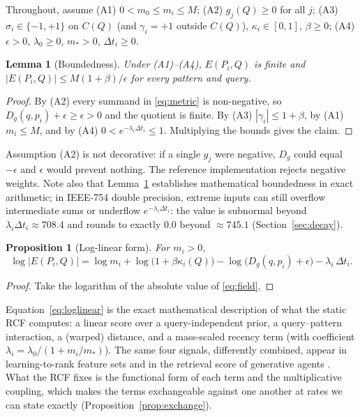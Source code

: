\documentclass[11pt]{article}
\newtheorem{lemma}{Lemma}
\newtheorem{proposition}{Proposition}
\theoremstyle{remark}
\newcommand{\act}{E}
\newcommand{\dist}{D_g}
\begin{document}
Throughout, assume (A1) $0 < m_0 \le m_i\le M$; (A2) $g_j(Q)\ge 0$ for all $j$; (A3) $\sigma_i\in\{-1,+1\}$ on $C(Q)$ (and $\gamma_i=+1$ outside $C(Q)$), $\kappa_i\in[0,1]$, $\beta\ge 0$; (A4) $\epsilon>0$, $\lambda_0\ge 0$, $m_\ast>0$, $\Delta t_i\ge 0$.

\begin{lemma}[Boundedness]
\label{lem:bound}
Under (A1)--(A4), $\act(P_i,Q)$ is finite and $|\act(P_i,Q)|\le M(1+\beta)/\epsilon$ for every pattern and query.
\end{lemma}
\begin{proof}
By (A2) every summand in \eqref{eq:metric} is non-negative, so $\dist(q,p_i)+\epsilon\ge\epsilon>0$ and the quotient is finite. By (A3) $|\gamma_i|\le 1+\beta$, by (A1) $m_i\le M$, and by (A4) $0<e^{-\lambda_i\Delta t_i}\le 1$. Multiplying the bounds gives the claim.
\end{proof}

Assumption (A2) is not decorative: if a single $g_j$ were negative, $\dist$ could equal $-\epsilon$ and $\epsilon$ would prevent nothing. The reference implementation rejects negative weights. Note also that Lemma~\ref{lem:bound} establishes mathematical boundedness in exact arithmetic; in IEEE-754 double precision, extreme inputs can still overflow intermediate sums or underflow $e^{-\lambda_i\Delta t_i}$: the value is subnormal beyond $\lambda_i\Delta t_i \approx 708.4$ and rounds to exactly $0.0$ beyond $\approx 745.1$ (Section~\ref{sec:decay}).

\begin{proposition}[Log-linear form]
\label{prop:loglinear}
For $m_i>0$,
\begin{equation}
\label{eq:loglinear}
\log|\act(P_i,Q)| = \log m_i + \log\bigl(1+\beta\kappa_i(Q)\bigr) - \log\bigl(\dist(q,p_i)+\epsilon\bigr) - \lambda_i\,\Delta t_i .
\end{equation}
\end{proposition}
\begin{proof}
Take the logarithm of the absolute value of \eqref{eq:field}.
\end{proof}

Equation~\eqref{eq:loglinear} is the exact mathematical description of what the static RCF computes: a linear score over a query-independent prior, a query--pattern interaction, a (warped) distance, and a mass-scaled recency term (with coefficient $\lambda_i = \lambda_0/(1+m_i/m_\ast)$). The same four signals, differently combined, appear in learning-to-rank feature sets \citep{liu2009ltr} and in the retrieval score of generative agents \citep{park2023generative}. What the RCF fixes is the functional form of each term and the multiplicative coupling, which makes the terms exchangeable against one another at rates we can state exactly (Proposition~\ref{prop:exchange}).
\end{document}
